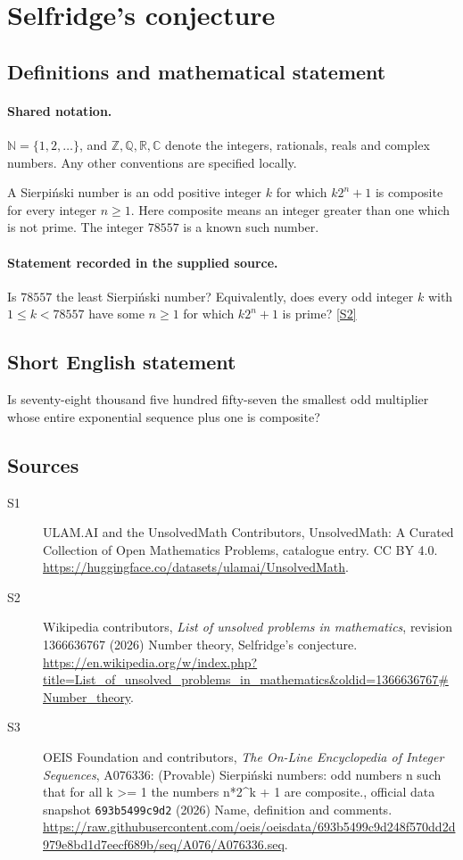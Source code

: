 \documentclass[11pt]{article}
\newcommand{\sref}[2]{\hyperlink{source:#1:#2}{[S#2]}}
\begin{document}
\section{Selfridge's conjecture}\label{statement}

\subsection{Definitions and mathematical statement}

\paragraph{Shared notation.}$\mathbb N=\{1,2,\ldots\}$, and $\mathbb Z,\mathbb Q,\mathbb R,\mathbb C$ denote the integers, rationals, reals and complex numbers. Any other conventions are specified locally.


A Sierpi\'nski number is an odd positive integer $k$ for which $k2^n+1$ is composite for every integer $n\ge1$. Here composite means an integer greater than one which is not prime. The integer $78557$ is a known such number.
\paragraph{Statement recorded in the supplied source.}
Is $78557$ the least Sierpi\'nski number? Equivalently, does every odd integer $k$ with $1\le k<78557$ have some $n\ge1$ for which $k2^n+1$ is prime? \sref{statement}{2}
\subsection{Short English statement}
Is seventy-eight thousand five hundred fifty-seven the smallest odd multiplier whose entire exponential sequence plus one is composite?
\subsection{Sources}
\begin{description}
\item[\hypertarget{source:statement:1}{S1}] ULAM.AI and the UnsolvedMath Contributors, UnsolvedMath: A Curated Collection of Open Mathematics Problems, catalogue entry. CC BY 4.0. \url{https://huggingface.co/datasets/ulamai/UnsolvedMath}.
\item[\hypertarget{source:statement:2}{S2}] Wikipedia contributors, \emph{List of unsolved problems in mathematics}, revision 1366636767 (2026) Number theory, Selfridge's conjecture. \url{https://en.wikipedia.org/w/index.php?title=List_of_unsolved_problems_in_mathematics&oldid=1366636767#Number_theory}.
\item[\hypertarget{source:statement:3}{S3}] OEIS Foundation and contributors, \emph{The On-Line Encyclopedia of Integer Sequences}, A076336: (Provable) Sierpiński numbers: odd numbers n such that for all k >= 1 the numbers n*2\textasciicircum{}k + 1 are composite., official data snapshot \texttt{693b5499c9d2} (2026) Name, definition and comments. \url{https://raw.githubusercontent.com/oeis/oeisdata/693b5499c9d248f570dd2d979e8bd1d7eecf689b/seq/A076/A076336.seq}.
\end{description}
\label{end:statement}
\end{document}
